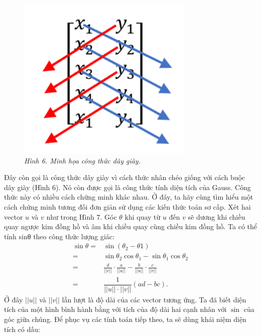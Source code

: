\begin{multicols}{2}
\begin{figure}[H]
		\includegraphics[width= 1\linewidth]{10}
		\caption{\small\textit{\color{toanhocdoisong}Hình 6. Minh họa công thức dây giày.}}
		\vspace*{-10pt}
	\end{figure}
	Đây còn gọi là công thức dây giày vì cách thức nhân chéo giống với cách buộc dây giày (Hình $6$). Nó còn được gọi là công thức tính diện tích của Gauss. Công thức này có nhiều cách chứng minh khác nhau. Ở đây, ta hãy cùng tìm hiểu một cách chứng minh tương đối đơn giản sử dụng các kiến thức toán sơ cấp.
	\vskip 0.05cm
	Xét hai vector $u$ và $v$ như trong Hình $7$. Góc $\theta$ khi quay từ $u$ đến $v$ sẽ dương khi chiều quay ngược kim đồng hồ và âm khi chiều quay cùng chiều kim đồng hồ. Ta có thể tính sinθ theo công thức lượng giác:
	\begin{align*}
		\sin\theta =& \sin(\theta_2 - \theta1)\\
		= &\sin\theta_2\cos\theta_1 - \sin\theta_1\cos\theta_2\\
		= &\frac{d}{||v||}\cdot\frac{a}{||u||} - \frac{b}{||u||}\cdot\frac{c}{||v||}\\
		= &\dfrac{1}{||u||\cdot ||v||}(ad - bc).
	\end{align*}
	Ở đây $||u||$ và $||v||$ lần lượt là độ dài của các vector tương ứng.
	\vskip 0.1cm
	Ta đã biết diện tích của một hình bình hành bằng với tích của độ dài hai cạnh nhân với $\sin$ của góc giữa chúng. Để phục vụ các tính toán tiếp theo, ta sẽ dùng khái niệm diện tích có dấu:

\end{multicols}
